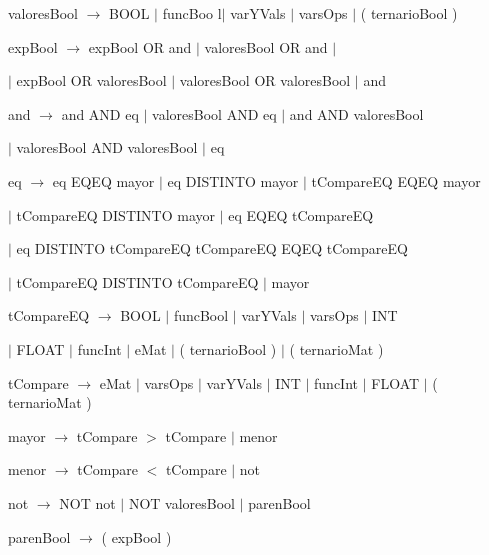 valoresBool $\rightarrow$ BOOL $|$ funcBoo l$|$ varYVals $|$ varsOps $|$ (  ternarioBool )  
 
 expBool $\rightarrow$ expBool OR and $|$ valoresBool OR and $|$
 
 \hspace{15mm}$|$ expBool OR valoresBool $|$ valoresBool OR valoresBool $|$ and
  
 and $\rightarrow$ and AND eq $|$ valoresBool AND eq $|$ and AND valoresBool 
 
 \hspace{15mm}$|$ valoresBool AND valoresBool $|$ eq

 eq $\rightarrow$ eq EQEQ mayor $|$ eq DISTINTO mayor $|$ tCompareEQ EQEQ mayor 
 
 \hspace{15mm} $|$ tCompareEQ DISTINTO mayor $|$ eq EQEQ tCompareEQ  
 
 \hspace{15mm} $|$ eq DISTINTO tCompareEQ  tCompareEQ EQEQ tCompareEQ 
 
 \hspace{15mm} $|$ tCompareEQ DISTINTO tCompareEQ $|$ mayor
  
 
 tCompareEQ $\rightarrow$ BOOL $|$ funcBool $|$ varYVals $|$ varsOps $|$ INT
  
 \hspace{15mm} $|$ FLOAT $|$ funcInt $|$ eMat $|$ ( ternarioBool )  $|$ ( ternarioMat )
  
  
  tCompare $\rightarrow$ eMat $|$ varsOps $|$ varYVals $|$ INT $|$ funcInt  $|$ FLOAT $|$ ( ternarioMat ) 
  
  mayor  $\rightarrow$ tCompare $>$ tCompare $|$ menor
  
  menor  $\rightarrow$ tCompare $<$ tCompare $|$ not
  
   not  $\rightarrow$  NOT not $|$ NOT valoresBool $|$ parenBool
  
  parenBool  $\rightarrow$ ( expBool ) 
  
  
